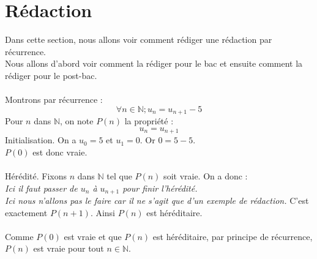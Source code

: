 \documentclass{article}
\begin{document}
	\section{Rédaction}

	Dans cette section, nous allons voir comment rédiger une rédaction par récurrence. \\
	Nous allons d'abord voir comment la rédiger pour le bac et ensuite comment la rédiger pour le post-bac. \\
	\\
	Montrons par récurrence :
	\[ \forall n \in \mathbb{N} ; u_n = u_{n+1} - 5 \]
	Pour $n$ dans $\mathbb{N}$, on note $P(n)$ la propriété :
	\[ u_n = u_{n+1} \]
	Initialisation. On a $u_0 = 5$ et $u_1 = 0$. Or $0 = 5-5$. \\
	$P(0)$ est donc vraie. \\
	\\
	Hérédité. Fixons $n$ dans $\mathbb{N}$ tel que $P(n)$ soit vraie. On a donc : \\
	\textit{
		Ici il faut passer de $u_n$ à $u_{n+1}$ pour finir l'hérédité. \\
		Ici nous n'allons pas le faire car il ne s'agit que d'un exemple de rédaction.
	}
	C'est exactement $P(n+1)$. Ainsi $P(n)$ est héréditaire. \\
	\\
	Comme $P(0)$ est vraie et que $P(n)$ est héréditaire, par principe de récurrence, $P(n)$ est vraie pour tout $n \in \mathbb{N}$.
\end{document}
